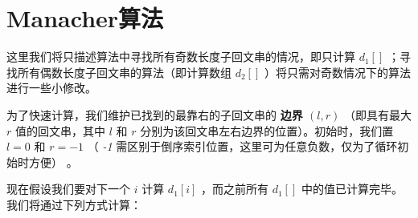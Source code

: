 \section{Manacher算法}

这里我们将只描述算法中寻找所有奇数长度子回文串的情况，即只计算 $d_1[]$ ；寻找所有偶数长度子回文串的算法（即计算数组 $d_2[]$ ）将只需对奇数情况下的算法进行一些小修改。

为了快速计算，我们维护已找到的最靠右的子回文串的 \textbf{边界 $(l, r)$} （即具有最大 $r$ 值的回文串，其中 $l$ 和 $r$ 分别为该回文串左右边界的位置）。初始时，我们置 $l = 0$ 和 $r = -1$ （ \textit{-1} 需区别于倒序索引位置，这里可为任意负数，仅为了循环初始时方便） 。

现在假设我们要对下一个 $i$ 计算 $d_1[i]$ ，而之前所有 $d_1[]$ 中的值已计算完毕。我们将通过下列方式计算：


